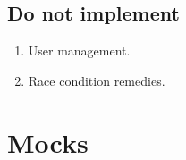 \documentclass{article}
\begin{document}
	\subsection{Do not implement}
	 
	 \begin{enumerate}
	 	\item User management.
	 	\item Race condition remedies.
	 \end{enumerate}

	 \section{Mocks}

	 \vspace{0.5cm}

	 \begin{center}
	 \end{center}
	 
	 \begin{center}
	 \end{center}


	 
\end{document}
